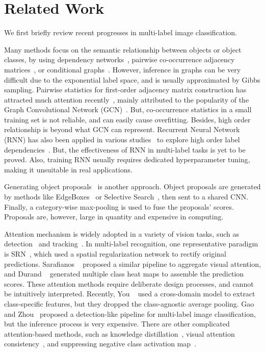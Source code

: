 \documentclass[10pt,twocolumn,letterpaper]{article}
\begin{document}
\section{Related Work}

We first briefly review recent progresses in multi-label image classification.

Many methods focus on the semantic relationship between objects or object classes, by using dependency networks~\cite{2011_IJCAI_Markov}, pairwise co-occurrence adjacency matrices~\cite{2019_ICCV_GCNre,2019_CVPR_GCN,2011_ICCV_Matrix}, or conditional graphs~\cite{2016_CVPR_condition_graph}. However, inference in graphs can be very difficult due to the exponential label space, and is usually approximated by Gibbs sampling. Pairwise statistics for first-order adjacency matrix construction has attracted much attention recently~\cite{2019_CVPR_GCN,2019_ICCV_GCNre,2020_AAAI_CMA}, mainly attributed to the popularity of the Graph Convolutional Network (GCN)~\cite{GCN_original}. But, co-occurrence statistics in a small training set is not reliable,  and can easily cause overfitting. Besides, high order relationship is beyond what GCN can represent. Recurrent Neural Network (RNN) has also been applied in various studies~\cite{2016_CVPR_RNNCNN,2017_CVPR_RNN,2018_TMM_RNN} to explore high order label dependencies~\cite{2018_TMM_RNN}. But, the effectiveness of RNN in multi-label tasks is yet to be proved. Also, training RNN usually requires dedicated hyperparameter tuning, making it unsuitable in real applications.

Generating object proposals~\cite{2015_PAMI_HCP,2018_ACM_KD,Wider,2016_ICIP_RCP} is another approach. Object proposals are generated by methods like EdgeBoxes~\cite{EdgeBox} or Selective Search~\cite{SS}, then sent to a shared CNN. Finally, a category-wise max-pooling is used to fuse the proposals' scores. Proposals are, however, large in quantity and expensive in computing.

Attention mechanism is widely adopted in a variety of vision tasks, such as detection~\cite{2019_Thundernet} and tracking~\cite{2018_tracking_end,2018_deep_tracking}. In multi-label recognition, one representative paradigm is SRN~\cite{2017_CVPR_SRN}, which used a spatial regularization network to rectify original predictions. Sarafianos \etal~\cite{2018_ECCV_CAM} proposed a similar pipeline to aggregate visual attention, and Durand \etal~\cite{2017_VOC95} generated multiple class heat maps to assemble the prediction scores. These attention methods require deliberate design processes, and cannot be intuitively interpreted. Recently, You \etal~\cite{2020_AAAI_CMA} used a cross-domain model to extract class-specific features, but they dropped the class-agnostic average pooling. Gao and Zhou~\cite{2020_arxiv_Gaobb} proposed a detection-like pipeline for multi-label image classification, but the inference process is very expensive. There are other complicated attention-based methods, such as knowledge distillation~\cite{2018_ACM_KD}, visual attention consistency~\cite{2019_CVPR_VA}, and suppressing negative class activation map~\cite{2020_ECCV}.
\end{document}
